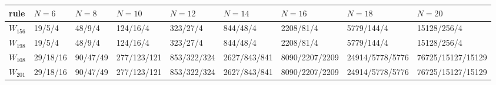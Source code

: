 \begin{tabular}{lllllllll}
\toprule
rule & $N=6$ & $N=8$ & $N=10$ & $N=12$ & $N=14$ & $N=16$ & $N=18$ & $N=20$ \\
\midrule
$W_{156}$ & 19/5/4 & 48/9/4 & 124/16/4 & 323/27/4 & 844/48/4 & 2208/81/4 & 5779/144/4 & 15128/256/4 \\
$W_{198}$ & 19/5/4 & 48/9/4 & 124/16/4 & 323/27/4 & 844/48/4 & 2208/81/4 & 5779/144/4 & 15128/256/4 \\
$W_{108}$ & 29/18/16 & 90/47/49 & 277/123/121 & 853/322/324 & 2627/843/841 & 8090/2207/2209 & 24914/5778/5776 & 76725/15127/15129 \\
$W_{201}$ & 29/18/16 & 90/47/49 & 277/123/121 & 853/322/324 & 2627/843/841 & 8090/2207/2209 & 24914/5778/5776 & 76725/15127/15129 \\
\bottomrule
\end{tabular}
